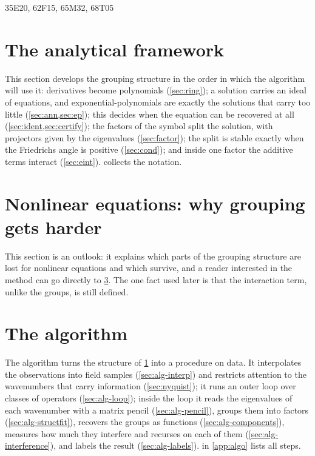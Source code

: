 \begin{MSCcodes}
35E20, 62F15, 65M32, 68T05
\end{MSCcodes}



\section{The analytical framework}\label{sec:analysis}
This section develops the grouping structure in the order in which the algorithm will use it: derivatives become
polynomials (\cref{sec:ring}); a solution carries an ideal of equations, and exponential-polynomials are exactly the
solutions that carry too little (\cref{sec:ann,sec:ep}); this decides when the equation can be recovered at all
(\cref{sec:ident,sec:certify}); the factors of the symbol split the solution, with projectors given by the eigenvalues
(\cref{sec:factor}); the split is stable exactly when the Friedrichs angle is positive (\cref{sec:cond}); and inside one
factor the additive terms interact (\cref{sec:eint}).  collects the notation.









\section{Nonlinear equations: why grouping gets harder}\label{sec:nonlinear}
This section is an outlook: it explains which parts of the grouping structure are lost for nonlinear equations and
which survive, and a reader interested in the method can go directly to \cref{sec:algorithm}. The one fact used later
is that the interaction term, unlike the groups, is still defined.



\section{The algorithm}\label{sec:algorithm}
The algorithm turns the structure of \cref{sec:analysis} into a procedure on data. It interpolates the observations
into field samples (\cref{sec:alg-interp}) and restricts attention to the wavenumbers that carry information
(\cref{sec:nyquist}); it runs an outer loop over classes of operators (\cref{sec:alg-loop}); inside the loop it reads
the eigenvalues of each wavenumber with a matrix pencil (\cref{sec:alg-pencil}), groups them into factors
(\cref{sec:alg-structfit}), recovers the groups as functions (\cref{sec:alg-components}), measures how much they
interfere and recurses on each of them (\cref{sec:alg-interference}), and labels the result (\cref{sec:alg-labels}).
 in \cref{app:algo} lists all steps.






